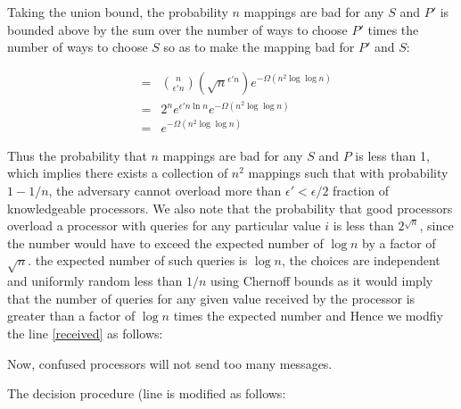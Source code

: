 \documentclass[letterpaper,11pt]{article}
\begin{document}
{Taking the union bound, the probability $n$ mappings are bad for any $S$ and $P'$ is  bounded above by the sum over the number of ways to choose $P'$ times the number of ways to choose $S$ so as to make the mapping bad for $P'$ and $S$:

\begin{eqnarray}
& = & {n \choose \epsilon' n} (\sqrt{n}^{\epsilon' n})        e^{-\Omega ( n^2 \log \log n)} \\
& = & 2^n e^{ \epsilon' n \ln n}  e^{-\Omega ( n^2 \log \log n)} \\
& = & e^{-\Omega ( n^2 \log \log n)}
\end{eqnarray}

Thus the probability that $n$ mappings are bad for any $S$ and $P$ is less than 1, which implies there exists
a collection of $n^2$  mappings such that with probability $1-1/n$, the adversary cannot overload more than $\epsilon'< \epsilon/2 $ fraction of knowledgeable processors.  We also note that the probability that good processors overload a processor with queries for any particular value
$i$  is less than $2^{\sqrt{n}}$, since the number would have to exceed the expected number of $\log n$ by
a factor of $\sqrt{n}$. the expected number of such queries is $\log n$, the choices are independent and uniformly random less than 
$1/n$ using Chernoff bounds as it would imply that the number of queries for any given value received by the processor is
greater than a factor of $ \log n$ times the expected number and
Hence we  modfiy the line \ref{received} as follows:

Now, confused processors will not send too many messages. 

The decision procedure (line \label{majority} is modified as follows:
}
\end{document}
